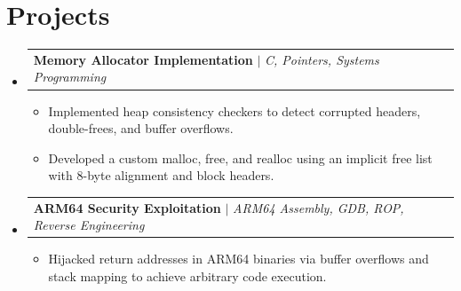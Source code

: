 \documentclass[letterpaper,11pt]{article}
\makeatletter
\newcommand{\resumeItem}[1]{
  \item\small{
    {#1 \vspace{-2pt}}
  }
}
\newcommand{\resumeProjectHeading}[2]{
    \item
    \begin{tabular*}{0.97\textwidth}{l@{\extracolsep{\fill}}r}
      \small#1 & #2 \\
    \end{tabular*}\vspace{-7pt}
}
\newcommand{\resumeSubHeadingListStart}{\begin{itemize}[leftmargin=0.15in, label={}]}
\newcommand{\resumeSubHeadingListEnd}{\end{itemize}}
\newcommand{\resumeItemListStart}{\begin{itemize}[leftmargin=0.2in]}
\newcommand{\resumeItemListEnd}{\end{itemize}\vspace{-5pt}}
\makeatother
\begin{document}
\section{Projects}
\resumeSubHeadingListStart

    \resumeProjectHeading
      {\textbf{Memory Allocator Implementation} $|$ \emph{C, Pointers, Systems Programming}}{}
      \resumeItemListStart
        \resumeItem{Implemented heap consistency checkers to detect corrupted headers, double-frees, and buffer overflows.}
        \resumeItem{Developed a custom malloc, free, and realloc using an implicit free list with 8-byte alignment and block headers.}
      \resumeItemListEnd

    \resumeProjectHeading
      {\textbf{ARM64 Security Exploitation} $|$ \emph{ARM64 Assembly, GDB, ROP, Reverse Engineering}}{}
      \resumeItemListStart
        \resumeItem{Hijacked return addresses in ARM64 binaries via buffer overflows and stack mapping to achieve arbitrary code execution.}
      \resumeItemListEnd

\resumeSubHeadingListEnd
\end{document}
